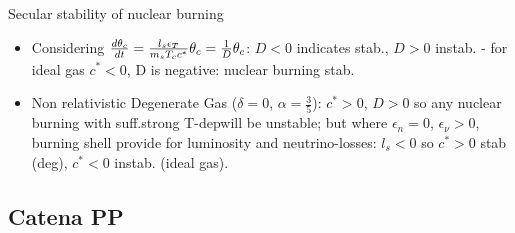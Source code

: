 \begin{frame}{Secular stability of nuclear burning}
\begin{itemize}
        \item Considering  $\TDy{t}{\theta_c}=\frac{l_s\epsilon_T}{m_sT_cc^*}\theta_c=\frac{1}{D}\theta_c$: $D<0$ indicates stab., $D>0$ instab. - for ideal gas $c^*<0$, D is negative: nuclear burning stab.
        \item Non relativistic Degenerate Gas ($\delta=0$, $\alpha=\frac{3}{5}$): $c^*>0$, $D>0$ so any nuclear burning with suff.strong T-depwill be unstable; but where $\epsilon_n=0$, $\epsilon_{\nu}>0$, burning shell provide for luminosity and neutrino-losses: $l_s<0$ so $c^*>0$ stab (deg), $c^*<0$ instab. (ideal gas).
\end{itemize}
\end{frame}

\subsection{Catena PP}

